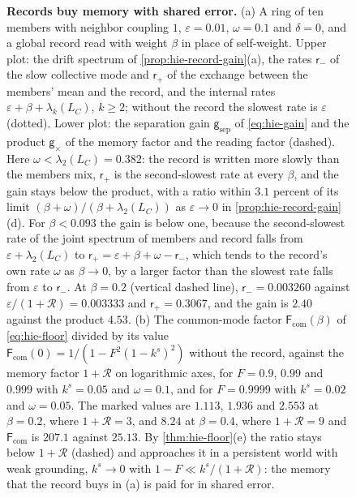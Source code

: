 \begin{figure}[!t]
  \centering
  
  \caption{\textbf{Records buy memory with shared error.} (a) A ring of ten members with neighbor coupling $1$, $\varepsilon=0.01$, $\omega=0.1$ and $\delta=0$, and a global record read with weight $\beta$ in place of self-weight. Upper plot: the drift spectrum of \cref{prop:hie-record-gain}(a), the rates $\mathsf r_-$ of the slow collective mode and $\mathsf r_+$ of the exchange between the members' mean and the record, and the internal rates $\varepsilon+\beta+\lambda_k(L_C)$, $k\ge2$; without the record the slowest rate is $\varepsilon$ (dotted). Lower plot: the separation gain $\mathsf g_{\mathrm{sep}}$ of \eqref{eq:hie-gain} and the product $\mathsf g_\times$ of the memory factor and the reading factor (dashed). Here $\omega<\lambda_2(L_C)=0.382$: the record is written more slowly than the members mix, $\mathsf r_+$ is the second-slowest rate at every $\beta$, and the gain stays below the product, with a ratio within $3.1$ percent of its limit $(\beta+\omega)/(\beta+\lambda_2(L_C))$ as $\varepsilon\to0$ in \cref{prop:hie-record-gain}(d). For $\beta<0.093$ the gain is below one, because the second-slowest rate of the joint spectrum of members and record falls from $\varepsilon+\lambda_2(L_C)$ to $\mathsf r_+=\varepsilon+\beta+\omega-\mathsf r_-$, which tends to the record's own rate $\omega$ as $\beta\to0$, by a larger factor than the slowest rate falls from $\varepsilon$ to $\mathsf r_-$. At $\beta=0.2$ (vertical dashed line), $\mathsf r_-=0.003260$ against $\varepsilon/(1+\mathcal R)=0.003333$ and $\mathsf r_+=0.3067$, and the gain is $2.40$ against the product $4.53$. (b) The common-mode factor $\mathsf F_{\mathrm{com}}(\beta)$ of \eqref{eq:hie-floor} divided by its value $\mathsf F_{\mathrm{com}}(0)=1/(1-F^2(1-k^s)^2)$ without the record, against the memory factor $1+\mathcal R$ on logarithmic axes, for $F=0.9$, $0.99$ and $0.999$ with $k^s=0.05$ and $\omega=0.1$, and for $F=0.9999$ with $k^s=0.02$ and $\omega=0.05$. The marked values are $1.113$, $1.936$ and $2.553$ at $\beta=0.2$, where $1+\mathcal R=3$, and $8.24$ at $\beta=0.4$, where $1+\mathcal R=9$ and $\mathsf F_{\mathrm{com}}$ is $207.1$ against $25.13$. By \cref{thm:hie-floor}(e) the ratio stays below $1+\mathcal R$ (dashed) and approaches it in a persistent world with weak grounding, $k^s\to0$ with $1-F\ll k^s/(1+\mathcal R)$: the memory that the record buys in (a) is paid for in shared error.}
  \label{fig:hie-records}
\end{figure}

